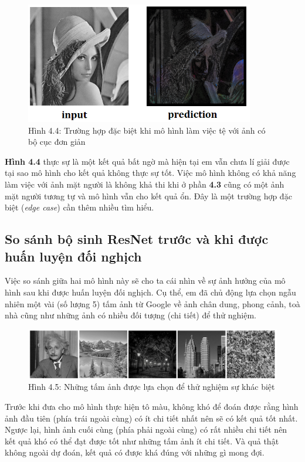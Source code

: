 \documentclass[a4paper]{article}
\begin{document}
\begin{figure}[h!]
\centering
\includegraphics[width=10cm]{images/4_13.png}
\caption{Hình 4.4: Trường hợp đặc biệt khi mô hình làm việc tệ với ảnh có bộ cục đơn giản}
\end{figure}

\noindent
\textbf{Hình 4.4} thực sự là một kết quả bất ngờ mà hiện tại em vẫn chưa lí giải được tại sao mô hình cho kết quả không thực sự tốt. Việc mô hình không có khả năng làm việc với ảnh mặt người là không khả thi khi ở phần \textbf{4.3 } cũng có một ảnh mặt người tương tự và mô hình vẫn cho kết quả ổn. Đây là một trường hợp đặc biệt (\textit{edge case}) cần  thêm nhiều tìm hiểu.

\subsection{So sánh bộ sinh ResNet trước và khi được huấn luyện đối nghịch}\label{compare}
Việc so sánh giữa hai mô hình này sẽ cho ta cái nhìn về sự ảnh hưởng của mô hình sau khi được huấn luyện đối nghịch. Cụ thể, em đã chủ động lựa chọn ngẫu nhiên một vài (số lượng 5) tấm ảnh từ Google về ảnh chân dung, phong cảnh, toà nhà cũng như những ảnh có nhiều đối tượng (chi tiết) để thử nghiệm.

\begin{figure}[h!]
\centering
\includegraphics[width=15cm]{images/4_2.PNG}
\caption{Hình 4.5: Những tấm ảnh được lựa chọn để thử nghiệm sự khác biệt}
\end{figure}

\noindent
Trước khi đưa cho mô hình thực hiện tô màu, không khó để đoán được rằng hình ảnh đầu tiên (phía trái ngoài cùng) có ít chi tiết nhất nên sẽ có kết quả tốt nhất. Ngược lại, hình ảnh cuối cùng (phía phải ngoài cùng) có rất nhiều chi tiết nên kết quả khó có thể đạt được tốt như những tấm ảnh ít chi tiết. Và quả thật không ngoài dự đoán, kết quả có được khá đúng với những gì mong đợi.
\end{document}
